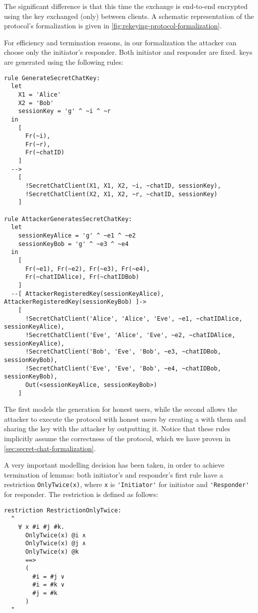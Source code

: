 The significant difference is that this time the \DiHe{} exchange is end-to-end encrypted using the \schat{} key exchanged (only) between clients. A schematic representation of the protocol's formalization is given in \cref{fig:rekeying-protocol-formalization}.

For efficiency and termination reasons, in our formalization the attacker can choose only the initiator's responder. Both initiator and responder are fixed. \Schat{} keys are generated using the following rules:

\begin{lstlisting}
rule GenerateSecretChatKey:
  let
    X1 = 'Alice'
    X2 = 'Bob'
    sessionKey = 'g' ^ ~i ^ ~r
  in
    [
      Fr(~i),
      Fr(~r),
      Fr(~chatID)
    ]
  -->
    [ 
      !SecretChatClient(X1, X1, X2, ~i, ~chatID, sessionKey),
      !SecretChatClient(X2, X1, X2, ~r, ~chatID, sessionKey)
    ]

rule AttackerGeneratesSecretChatKey:
  let
    sessionKeyAlice = 'g' ^ ~e1 ^ ~e2
    sessionKeyBob = 'g' ^ ~e3 ^ ~e4
  in
    [ 
      Fr(~e1), Fr(~e2), Fr(~e3), Fr(~e4),
      Fr(~chatIDAlice), Fr(~chatIDBob)
    ]
  --[ AttackerRegisteredKey(sessionKeyAlice), AttackerRegisteredKey(sessionKeyBob) ]->
    [
      !SecretChatClient('Alice', 'Alice', 'Eve', ~e1, ~chatIDAlice, sessionKeyAlice),
      !SecretChatClient('Eve', 'Alice', 'Eve', ~e2, ~chatIDAlice, sessionKeyAlice),
      !SecretChatClient('Bob', 'Eve', 'Bob', ~e3, ~chatIDBob, sessionKeyBob),
      !SecretChatClient('Eve', 'Eve', 'Bob', ~e4, ~chatIDBob, sessionKeyBob),
      Out(<sessionKeyAlice, sessionKeyBob>)
    ]
\end{lstlisting}

The first models the generation for honest users, while the second allows the attacker to execute the protocol with honest users by creating a \schat{} with them and sharing the key with the attacker by outputting it. Notice that these rules implicitly assume the correctness of the \schat{} protocol, which we have proven in \cref{sec:secret-chat-formalization}.

A very important modelling decision has been taken, in order to achieve termination of lemmas: both initiator's and responder's first rule have a restriction \lstinline{OnlyTwice(x)}, where \lstinline{x} is \lstinline{'Initiator'} for initiator and \lstinline{'Responder'} for responder. The restriction is defined as follows:

\begin{lstlisting}
restriction RestrictionOnlyTwice:
  "
    ∀ x #i #j #k. 
      OnlyTwice(x) @i ∧
      OnlyTwice(x) @j ∧
      OnlyTwice(x) @k 
      ==>
      (
        #i = #j ∨
        #i = #k ∨
        #j = #k
      )
  "
\end{lstlisting}

